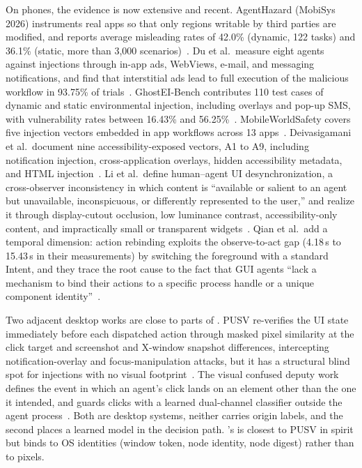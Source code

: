 On phones, the evidence is now extensive and recent. AgentHazard (MobiSys 2026) instruments real apps so that only regions writable by third parties are modified, and reports average misleading rates of 42.0\% (dynamic, 122 tasks) and 36.1\% (static, more than 3,000 scenarios)~\cite{liu2026agenthazard}. Du et al.\ measure eight agents against injections through in-app ads, WebViews, e-mail, and messaging notifications, and find that interstitial ads lead to full execution of the malicious workflow in 93.75\% of trials~\cite{du2025measuringmobileagents}. GhostEI-Bench contributes 110 test cases of dynamic and static environmental injection, including overlays and pop-up SMS, with vulnerability rates between 16.43\% and 56.25\%~\cite{chen2025ghosteibench}. MobileWorldSafety covers five injection vectors embedded in app workflows across 13 apps~\cite{chen2026mobileworldsafety}. Deivasigamani et al.\ document nine accessibility-exposed vectors, A1 to A9, including notification injection, cross-application overlays, hidden accessibility metadata, and HTML injection~\cite{deivasigamani2026nota11y}. Li et al.\ define human--agent UI desynchronization, a cross-observer inconsistency in which content is ``available or salient to an agent but unavailable, inconspicuous, or differently represented to the user,'' and realize it through display-cutout occlusion, low luminance contrast, accessibility-only content, and impractically small or transparent widgets~\cite{li2026uidesync}. Qian et al.\ add a temporal dimension: action rebinding exploits the observe-to-act gap (4.18\,s to 15.43\,s in their measurements) by switching the foreground with a standard Intent, and they trace the root cause to the fact that GUI agents ``lack a mechanism to bind their actions to a specific process handle or a unique component identity''~\cite{qian2026zeropermission}.

Two adjacent desktop works are close to parts of \PG{}. PUSV re-verifies the UI state immediately before each dispatched action through masked pixel similarity at the click target and screenshot and X-window snapshot differences, intercepting notification-overlay and focus-manipulation attacks, but it has a structural blind spot for injections with no visual footprint~\cite{xu2026pusv}. The visual confused deputy work defines the event in which an agent's click lands on an element other than the one it intended, and guards clicks with a learned dual-channel classifier outside the agent process~\cite{liu2026visualconfuseddeputy}. Both are desktop systems, neither carries origin labels, and the second places a learned model in the decision path. \PG{}'s \DB{} is closest to PUSV in spirit but binds to OS identities (window token, node identity, node digest) rather than to pixels.

